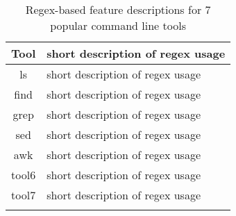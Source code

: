 \begin{table}
\caption{Regex-based feature descriptions for 7 popular command line tools}
\label{table:shellTools}
\begin{center}
\begin{small}
\begin{tabular} {cl | c c c c c}
\textbf{Tool} & \multicolumn{6}{l}{short description of regex usage}\\ \hline
ls & \multicolumn{6}{l}{short description of regex usage} \\
find    & \multicolumn{6}{l}{short description of regex usage}\\
grep   &  \multicolumn{6}{l}{short description of regex usage}\\
sed  &  \multicolumn{6}{l}{short description of regex usage}\\
awk     & \multicolumn{6}{l}{short description of regex usage}\\
tool6   & \multicolumn{6}{l}{short description of regex usage}\\
tool7    & \multicolumn{6}{l}{short description of regex usage}\\
\\
\end{tabular}
\end{small}
\end{center}
\end{table}
